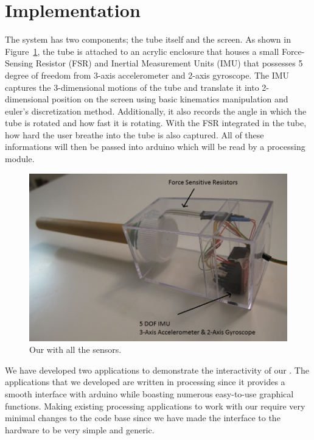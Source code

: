 \section{Implementation}\label{sec:impl}

The \tube system has two components; the tube itself and the screen. As shown in Figure~\ref{fig:impl1}, the tube is attached to an acrylic enclosure that houses a small Force-Sensing Resistor (FSR) and Inertial Measurement Units (IMU) that possesses 5 degree of freedom from 3-axis accelerometer and 2-axis gyroscope. The IMU captures the 3-dimensional motions of the tube and translate it into 2-dimensional position on the screen using basic kinematics manipulation and euler's discretization method. Additionally, it also records the angle in which the tube is rotated and how fast it is rotating. With the FSR integrated in the tube, how hard the user breathe into the tube is also captured. All of these informations will then be passed into arduino which will be read by a processing module.

\begin{figure}
  \centering
  \includegraphics[width=\linewidth]{./figs/impl1.png}
  \caption{Our \tube with all the sensors.}
  \label{fig:impl1}
\end{figure}


We have developed two applications to demonstrate the interactivity of our \tube. The applications that we developed are written in processing since it provides a smooth interface with arduino while boasting numerous easy-to-use graphical functions. Making existing processing applications to work with our \tube require very minimal changes to the code base since we have made the interface to the hardware to be very simple and generic.

